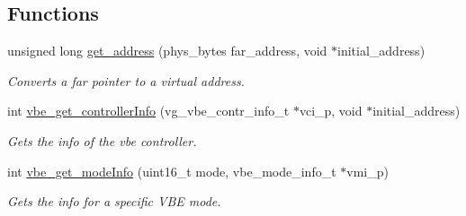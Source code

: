 \subsection*{Functions}
\begin{DoxyCompactItemize}
\item 
unsigned long \mbox{\hyperlink{group__vbe_gade4fa75fe0fb04b2752fff230f59ae5b}{get\+\_\+address}} (phys\+\_\+bytes far\+\_\+address, void $\ast$initial\+\_\+address)
\begin{DoxyCompactList}\small\item\em Converts a far pointer to a virtual address. \end{DoxyCompactList}\item 
int \mbox{\hyperlink{group__vbe_gac4f0e0f63a38a9fece2405ffac61618b}{vbe\+\_\+get\+\_\+controller\+Info}} (vg\+\_\+vbe\+\_\+contr\+\_\+info\+\_\+t $\ast$vci\+\_\+p, void $\ast$initial\+\_\+address)
\begin{DoxyCompactList}\small\item\em Gets the info of the vbe controller. \end{DoxyCompactList}\item 
int \mbox{\hyperlink{group__vbe_ga9e78fdbbaab721c0b5075380a0688cff}{vbe\+\_\+get\+\_\+mode\+Info}} (uint16\+\_\+t mode, vbe\+\_\+mode\+\_\+info\+\_\+t $\ast$vmi\+\_\+p)
\begin{DoxyCompactList}\small\item\em Gets the info for a specific V\+BE mode. \end{DoxyCompactList}\end{DoxyCompactItemize}
